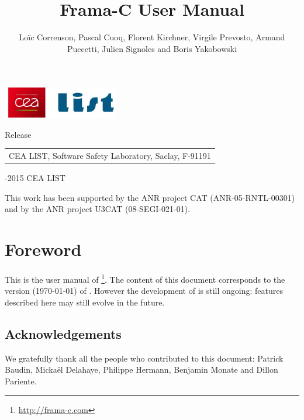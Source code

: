 \documentclass[web]{frama-c-book}
\begin{document}

\begin{titlepage}
\begin{flushleft}
\includegraphics[height=14mm]{cealistlogo.jpg}
\end{flushleft}
\vfill
\title{Frama-C User Manual}{Release \framacversion}
\author{Loïc Correnson, Pascal Cuoq, Florent Kirchner, Virgile Prevosto, 
Armand Puccetti, Julien Signoles and Boris Yakobowski}
\begin{tabular}{l}
CEA LIST, Software Safety Laboratory, Saclay, F-91191 \\
\end{tabular}
\vfill
\begin{flushleft}
  -2015 CEA LIST

This work has been supported by the ANR project CAT (ANR-05-RNTL-00301) and by
the ANR project U3CAT (08-SEGI-021-01).
\end{flushleft}
\end{titlepage}

\tableofcontents


\chapter*{Foreword}
\markright{}

This is the user manual of \FramaC\footnote{\url{http://frama-c.com}}.  The
content of this document corresponds to the version \framacversion (\today) of
\FramaC. However the development of \FramaC is still ongoing: features
described here may still evolve in the future.

\section*{Acknowledgements}

We gratefully thank all the people who contributed to this document: Patrick
Baudin, Mickaël Delahaye, Philippe Hermann, Benjamin Monate and Dillon Pariente.

\end{document}
